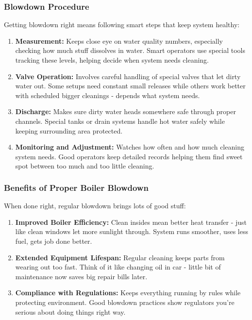 \subsubsection{Blowdown Procedure}
Getting blowdown right means following smart steps that keep system healthy:
\begin{enumerate}
    \item \textbf{Measurement:} Keeps close eye on water quality numbers, especially checking how much stuff dissolves in water. Smart operators use special tools tracking these levels, helping decide when system needs cleaning.
    \item \textbf{Valve Operation:} Involves careful handling of special valves that let dirty water out. Some setups need constant small releases while others work better with scheduled bigger cleanings - depends what system needs.
    \item \textbf{Discharge:} Makes sure dirty water heads somewhere safe through proper channels. Special tanks or drain systems handle hot water safely while keeping surrounding area protected.
    \item \textbf{Monitoring and Adjustment:} Watches how often and how much cleaning system needs. Good operators keep detailed records helping them find sweet spot between too much and too little cleaning.
\end{enumerate}

\subsubsection{Benefits of Proper Boiler Blowdown}
When done right, regular blowdown brings lots of good stuff:
\begin{enumerate}
    \item \textbf{Improved Boiler Efficiency:} Clean insides mean better heat transfer - just like clean windows let more sunlight through. System runs smoother, uses less fuel, gets job done better.
    \item \textbf{Extended Equipment Lifespan:} Regular cleaning keeps parts from wearing out too fast. Think of it like changing oil in car - little bit of maintenance now saves big repair bills later.
    \item \textbf{Compliance with Regulations:} Keeps everything running by rules while protecting environment. Good blowdown practices show regulators you're serious about doing things right way.
\end{enumerate}


